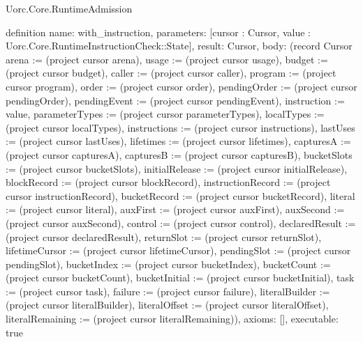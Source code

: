 \begin{lexlean}{Uorc.Core.RuntimeAdmission}
\begin{semanticmodule}
definition{
  name: with_instruction,
  parameters: [cursor : Cursor, value : Uorc.Core.RuntimeInstructionCheck::State],
  result: Cursor,
  body: (record Cursor {arena := (project cursor arena), usage := (project cursor usage), budget := (project cursor budget), caller := (project cursor caller), program := (project cursor program), order := (project cursor order), pendingOrder := (project cursor pendingOrder), pendingEvent := (project cursor pendingEvent), instruction := value, parameterTypes := (project cursor parameterTypes), localTypes := (project cursor localTypes), instructions := (project cursor instructions), lastUses := (project cursor lastUses), lifetimes := (project cursor lifetimes), capturesA := (project cursor capturesA), capturesB := (project cursor capturesB), bucketSlots := (project cursor bucketSlots), initialRelease := (project cursor initialRelease), blockRecord := (project cursor blockRecord), instructionRecord := (project cursor instructionRecord), bucketRecord := (project cursor bucketRecord), literal := (project cursor literal), auxFirst := (project cursor auxFirst), auxSecond := (project cursor auxSecond), control := (project cursor control), declaredResult := (project cursor declaredResult), returnSlot := (project cursor returnSlot), lifetimeCursor := (project cursor lifetimeCursor), pendingSlot := (project cursor pendingSlot), bucketIndex := (project cursor bucketIndex), bucketCount := (project cursor bucketCount), bucketInitial := (project cursor bucketInitial), task := (project cursor task), failure := (project cursor failure), literalBuilder := (project cursor literalBuilder), literalOffset := (project cursor literalOffset), literalRemaining := (project cursor literalRemaining)}),
  axioms: [],
  executable: true
}


\end{semanticmodule}
\end{lexlean}
